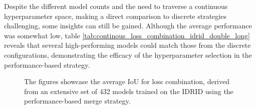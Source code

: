 Despite the different model counts and the need to traverse a continuous hyperparameter space, making a direct comparison to discrete strategies challenging, some insights can still be gained. Although the average performance was somewhat low, table \ref{tab:continous_loss_combination_idrid_double_long} reveals that several high-performing models could match those from the discrete configurations, demonstrating the efficacy of the hyperparameter selection in the performance-based strategy.
\begin{figure}[H]%
  \centering
  \caption[Average IoU for Loss Combination (IDRID)]{The figures showcase the average \ac{IoU} for loss combination, derived from an extensive set of 432 models trained on the \acf{IDRID} using the performance-based merge strategy.}
  \label{continous_loss_combination_results_idrid_short}
\end{figure}

